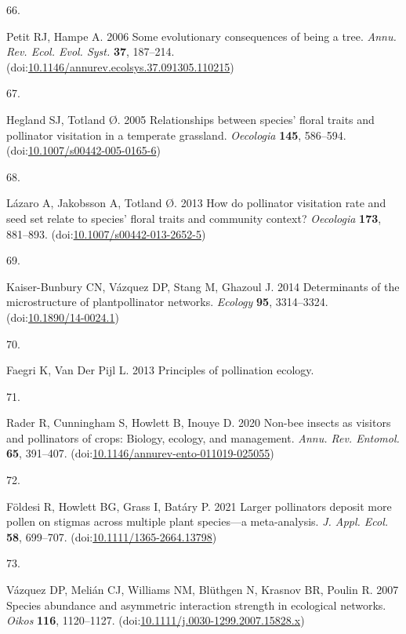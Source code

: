 \documentclass[
  12pt,
  a4paper,
]{article}
\newlength{\cslhangindent}
\newlength{\csllabelwidth}
\newlength{\cslentryspacingunit} %
\newenvironment{CSLReferences}[2] %
 {%
  \setlength{\parindent}{0pt}
  \ifodd #1
  \let\oldpar\par
  \def\par{\hangindent=\cslhangindent\oldpar}
  \fi
  \setlength{\parskip}{#2\cslentryspacingunit}
 }%
 {}
\newcommand{\CSLLeftMargin}[1]{\parbox[t]{\csllabelwidth}{#1}}
\newcommand{\CSLRightInline}[1]{\parbox[t]{\linewidth - \csllabelwidth}{#1}\break}
\begin{document}
\begin{CSLReferences}{0}{0}
\leavevmode{}%
\CSLLeftMargin{66. }
\CSLRightInline{Petit RJ, Hampe A. 2006 Some evolutionary consequences of being a tree. \emph{Annu. Rev. Ecol. Evol. Syst.} \textbf{37}, 187--214. (doi:\href{https://doi.org/10.1146/annurev.ecolsys.37.091305.110215}{10.1146/annurev.ecolsys.37.091305.110215})}

\leavevmode{}%
\CSLLeftMargin{67. }
\CSLRightInline{Hegland SJ, Totland Ø. 2005 Relationships between species' floral traits and pollinator visitation in a temperate grassland. \emph{Oecologia} \textbf{145}, 586--594. (doi:\href{https://doi.org/10.1007/s00442-005-0165-6}{10.1007/s00442-005-0165-6})}

\leavevmode{}%
\CSLLeftMargin{68. }
\CSLRightInline{Lázaro A, Jakobsson A, Totland Ø. 2013 How do pollinator visitation rate and seed set relate to species' floral traits and community context? \emph{Oecologia} \textbf{173}, 881--893. (doi:\href{https://doi.org/10.1007/s00442-013-2652-5}{10.1007/s00442-013-2652-5})}

\leavevmode{}%
\CSLLeftMargin{69. }
\CSLRightInline{Kaiser-Bunbury CN, Vázquez DP, Stang M, Ghazoul J. 2014 Determinants of the microstructure of plant\textendash pollinator networks. \emph{Ecology} \textbf{95}, 3314--3324. (doi:\href{https://doi.org/10.1890/14-0024.1}{10.1890/14-0024.1})}

\leavevmode{}%
\CSLLeftMargin{70. }
\CSLRightInline{Faegri K, Van Der Pijl L. 2013 Principles of pollination ecology. }

\leavevmode{}%
\CSLLeftMargin{71. }
\CSLRightInline{Rader R, Cunningham S, Howlett B, Inouye D. 2020 Non-bee insects as visitors and pollinators of crops: Biology, ecology, and management. \emph{Annu. Rev. Entomol.} \textbf{65}, 391--407. (doi:\href{https://doi.org/10.1146/annurev-ento-011019-025055}{10.1146/annurev-ento-011019-025055})}

\leavevmode{}%
\CSLLeftMargin{72. }
\CSLRightInline{Földesi R, Howlett BG, Grass I, Batáry P. 2021 Larger pollinators deposit more pollen on stigmas across multiple plant species---a meta-analysis. \emph{J. Appl. Ecol.} \textbf{58}, 699--707. (doi:\href{https://doi.org/10.1111/1365-2664.13798}{10.1111/1365-2664.13798})}

\leavevmode{}%
\CSLLeftMargin{73. }
\CSLRightInline{Vázquez DP, Melián CJ, Williams NM, Blüthgen N, Krasnov BR, Poulin R. 2007 Species abundance and asymmetric interaction strength in ecological networks. \emph{Oikos} \textbf{116}, 1120--1127. (doi:\href{https://doi.org/10.1111/j.0030-1299.2007.15828.x}{10.1111/j.0030-1299.2007.15828.x})}


\end{CSLReferences}
\end{document}
